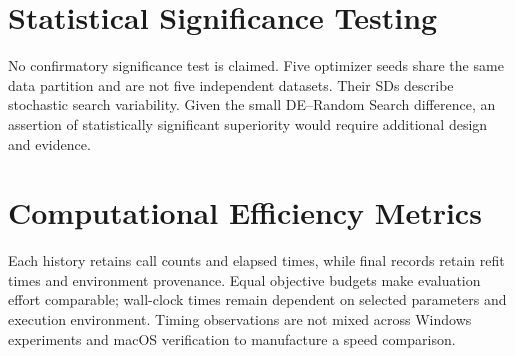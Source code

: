 \section{Statistical Significance Testing}
No confirmatory significance test is claimed. Five optimizer seeds share the same data partition and are not five independent datasets. Their SDs describe stochastic search variability. Given the small DE--Random Search difference, an assertion of statistically significant superiority would require additional design and evidence.
\section{Computational Efficiency Metrics}
Each history retains call counts and elapsed times, while final records retain refit times and environment provenance. Equal objective budgets make evaluation effort comparable; wall-clock times remain dependent on selected parameters and execution environment. Timing observations are not mixed across Windows experiments and macOS verification to manufacture a speed comparison.
